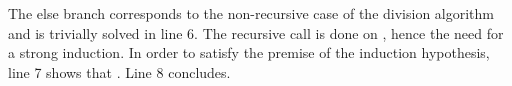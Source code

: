 The else branch corresponds to the non-recursive case of
the division algorithm and is trivially solved in line 6.
The recursive call is done on , hence the need for a strong
induction.  In order to satisfy the premise of the induction hypothesis,
line 7 shows that .  Line 8 concludes.

%
%
%
%
%
%
%
%
%
%
